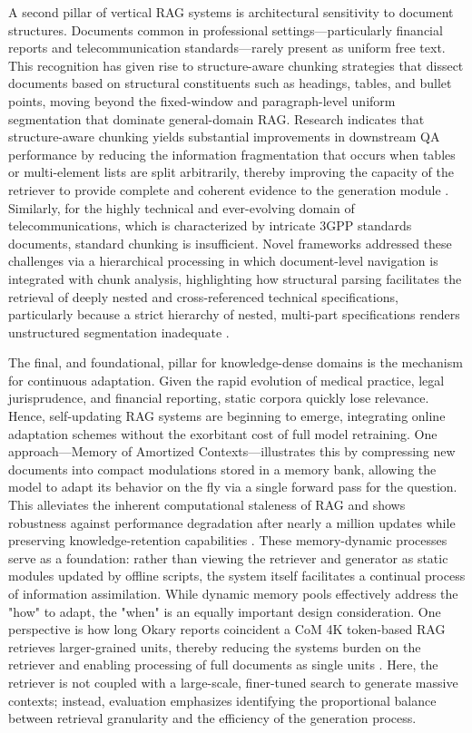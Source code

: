 \documentclass[11pt,a4paper]{article}
\begin{document}
A second pillar of vertical RAG systems is architectural sensitivity to document structures. Documents common in professional settings---particularly financial reports and telecommunication standards---rarely present as uniform free text. This recognition has given rise to structure-aware chunking strategies that dissect documents based on structural constituents such as headings, tables, and bullet points, moving beyond the fixed-window and paragraph-level uniform segmentation that dominate general-domain RAG. Research indicates that structure-aware chunking yields substantial improvements in downstream QA performance by reducing the information fragmentation that occurs when tables or multi-element lists are split arbitrarily, thereby improving the capacity of the retriever to provide complete and coherent evidence to the generation module \cite{arxiv:2402.05131v3}. Similarly, for the highly technical and ever-evolving domain of telecommunications, which is characterized by intricate 3GPP standards documents, standard chunking is insufficient. Novel frameworks addressed these challenges via a hierarchical processing in which document-level navigation is integrated with chunk analysis, highlighting how structural parsing facilitates the retrieval of deeply nested and cross-referenced technical specifications, particularly because a strict hierarchy of nested, multi-part specifications renders unstructured segmentation inadequate \cite{arxiv:2404.15939v3}.

The final, and foundational, pillar for knowledge-dense domains is the mechanism for continuous adaptation. Given the rapid evolution of medical practice, legal jurisprudence, and financial reporting, static corpora quickly lose relevance. Hence, self-updating RAG systems are beginning to emerge, integrating online adaptation schemes without the exorbitant cost of full model retraining. One approach---Memory of Amortized Contexts---illustrates this by compressing new documents into compact modulations stored in a memory bank, allowing the model to adapt its behavior on the fly via a single forward pass for the question. This alleviates the inherent computational staleness of RAG and shows robustness against performance degradation after nearly a million updates while preserving knowledge-retention capabilities \cite{arxiv:2403.04317v1,arxiv:2402.04624v1}. These memory-dynamic processes serve as a foundation: rather than viewing the retriever and generator as static modules updated by offline scripts, the system itself facilitates a continual process of information assimilation. While dynamic memory pools effectively address the "how" to adapt, the "when" is an equally important design consideration. One perspective is how long Okary reports coincident a CoM 4K token-based RAG retrieves larger-grained units, thereby reducing the systems burden on the retriever and enabling processing of full documents as single units \cite{arxiv:2406.15319v3}. Here, the retriever is not coupled with a large-scale, finer-tuned search to generate massive contexts; instead, evaluation emphasizes identifying the proportional balance between retrieval granularity and the efficiency of the generation process.
\end{document}
